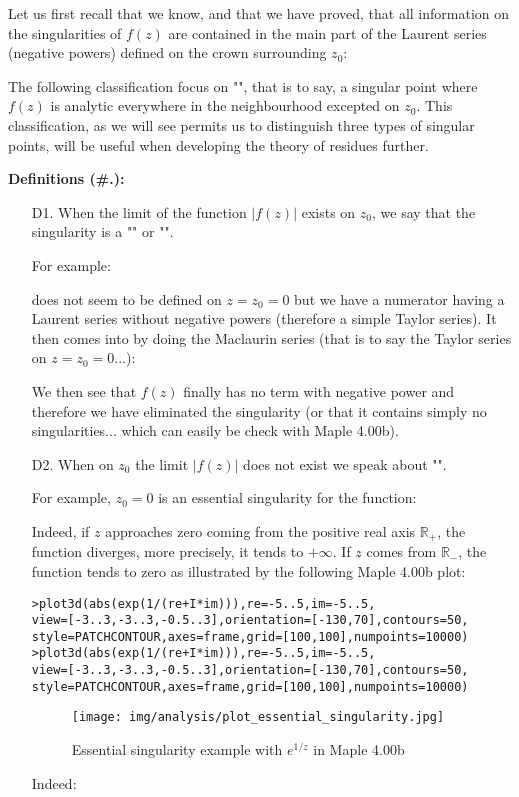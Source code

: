 	Let us first recall that we know, and that we have proved, that all information on the singularities of $f (z)$ are contained in the main part of the Laurent series (negative powers) defined on the crown surrounding $z_0$:
	
	The following classification focus on "", that is to say, a singular point where $f(z)$ is analytic everywhere in the neighbourhood excepted on $z_0$. This classification, as we will see permits us to distinguish three types of singular points, will be useful when developing the theory of residues further.
	
	\textbf{Definitions (\#\thesection.\mydef):}
	\begin{enumerate}
		\item[D1.] When the limit of the function $\vert f(z) \vert$ exists on $z_0$, we say that the singularity is a "" or "".
		
		For example:
		
		does not seem to be defined on $z=z_0=0$ but we have a numerator having a Laurent series without negative powers (therefore a simple Taylor series). It then comes into by doing the Maclaurin series (that is to say the Taylor series on $z=z_0=0$...):
		
		We then see that $f (z)$ finally has no term with negative power and therefore we have eliminated the singularity (or that it contains simply no singularities... which can easily be check with Maple 4.00b).
		
		\item[D2.] When on $z_0$ the limit $\vert f(z) \vert $ does not exist we speak about "".
		
		For example, $z_0=0$ is an essential singularity for the function:
		
		Indeed, if $z$ approaches zero coming from the positive real axis $\mathbb{R}_+$, the function diverges, more precisely, it tends to $+\infty$. If $z$ comes from $\mathbb{R}_-$, the function tends to zero as illustrated by the following Maple 4.00b plot:
		
		
		\texttt{>plot3d(abs(exp(1/(re+I*im))),re=-5..5,im=-5..5,\\
		view=[-3..3,-3..3,-0.5..3],orientation=[-130,70],contours=50,\\
		style=PATCHCONTOUR,axes=frame,grid=[100,100],numpoints=10000)\\
		>plot3d(abs(exp(1/(re+I*im))),re=-5..5,im=-5..5,\\
		view=[-3..3,-3..3,-0.5..3],orientation=[-130,70],contours=50,\\
		style=PATCHCONTOUR,axes=frame,grid=[100,100],numpoints=10000)}
		\begin{figure}[H]
			\centering
			\texttt{[image: img/analysis/plot\_essential\_singularity.jpg]}
			\caption{Essential singularity example with $e^{1/z}$ in Maple 4.00b}
		\end{figure}
		Indeed:
		

\end{enumerate}
